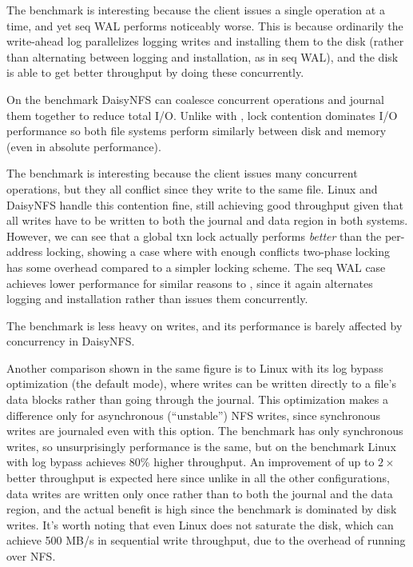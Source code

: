 The  benchmark is interesting because the client issues a single
operation at a time, and yet seq WAL performs noticeably worse. This is because ordinarily
the write-ahead log parallelizes logging writes and installing them to the
disk (rather than alternating between logging and installation, as in seq WAL), and the disk is
able to get better throughput by doing these concurrently.

On the  benchmark DaisyNFS can coalesce concurrent operations
and journal them together to reduce total I/O. Unlike with ,
lock contention dominates I/O performance so both file systems perform similarly
between disk and memory (even in absolute performance).

The  benchmark is interesting because the client issues many
concurrent operations, but they all conflict since they write to the same file.
Linux and DaisyNFS handle this contention fine, still achieving good throughput
given that all writes have to be written to both the journal and data region in
both systems. However, we can see that a global txn lock actually performs
\emph{better} than the per-address locking, showing a case where with enough
conflicts two-phase locking has some overhead compared to a simpler locking
scheme. The seq WAL case achieves lower performance for similar reasons to
, since it again alternates logging and installation rather than
issues them concurrently.

The  benchmark is less heavy on writes, and its performance
is barely affected by concurrency in DaisyNFS.

Another comparison shown in the same figure is to Linux with its log bypass
optimization (the default  mode), where writes can be written
directly to a file's data blocks rather than going through the journal. This optimization
makes a difference only for asynchronous (``unstable'') NFS writes, since synchronous writes
are journaled even with this option. The  benchmark has only
synchronous writes, so unsurprisingly performance is the same, but on the
 benchmark Linux with log bypass achieves 80\% higher throughput. An
improvement of up to $2\times$ better throughput is expected here since unlike
in all the other configurations, data writes are written only once rather than
to both the journal and the data region, and the actual benefit is high since
the benchmark is dominated by disk writes. It's worth noting that even Linux
does not saturate the disk, which can achieve 500 MB/s in sequential write
throughput, due to the overhead of running over NFS.

